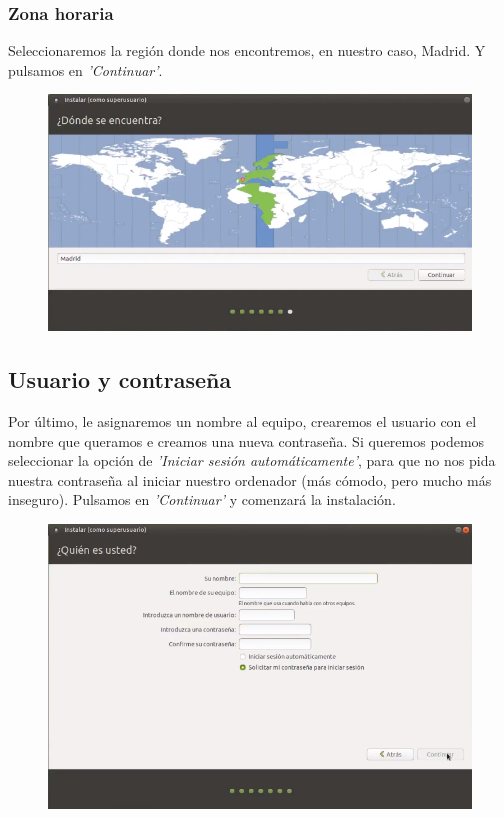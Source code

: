 \subsubsection{Zona horaria}
Seleccionaremos la región donde nos encontremos, en nuestro caso, Madrid. Y pulsamos en \textit{'Continuar'}.
\begin{figure}[H]
        \centering
        \includegraphics[width= 0.7 \textwidth]{Media/umate5.png}
\end{figure}

\subsection{Usuario y contraseña}
Por último, le asignaremos un nombre al equipo, crearemos el usuario con el nombre que queramos e creamos una nueva contraseña. Si queremos podemos seleccionar la opción de \textit{'Iniciar sesión automáticamente'}, para que no nos pida nuestra contraseña al iniciar nuestro ordenador (más cómodo, pero mucho más inseguro). 
\newline Pulsamos en \textit{'Continuar'} y comenzará la instalación.
\begin{figure}[H]
        \centering
        \includegraphics[width= 0.7 \textwidth]{Media/umate6.png}
\end{figure}

\newpage
